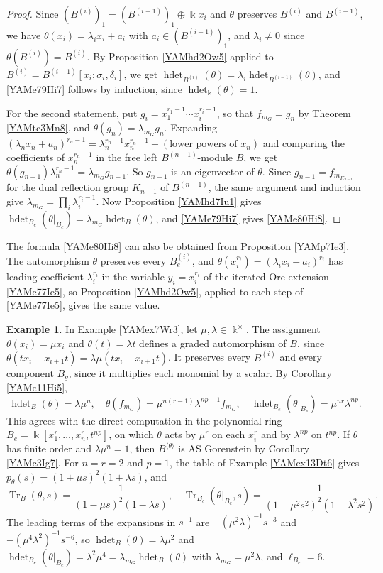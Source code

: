 \documentclass[reqno]{amsart}
\numberwithin{equation}{section}
\theoremstyle{definition}
\newtheorem{example}[equation]{Example}
\theoremstyle{remark}
\theoremstyle{plain}
\newcommand{\kk}{\Bbbk}
\DeclareMathOperator{\hdet}{hdet}
\DeclareMathOperator{\Tr}{Tr}
\begin{document}
\begin{proof}
Since $(B^{(i)})_1=(B^{(i-1)})_1\oplus\kk x_i$ and $\theta$ preserves $B^{(i)}$ and $B^{(i-1)}$, we have $\theta(x_i)=\lambda_ix_i+a_i$ with $a_i\in(B^{(i-1)})_1$, and $\lambda_i\neq0$ since $\theta(B^{(i)})=B^{(i)}$. By Proposition \ref{YAMhd2Ow5} applied to $B^{(i)}=B^{(i-1)}[x_i;\sigma_i,\delta_i]$, we get $\hdet_{B^{(i)}}(\theta)=\lambda_i\hdet_{B^{(i-1)}}(\theta)$, and \eqref{YAMe79Hi7} follows by induction, since $\hdet_\kk(\theta)=1$.

For the second statement, put $g_i=x_1^{r_1-1}\cdots x_i^{r_i-1}$, so that $f_{m_G}=g_n$ by Theorem \ref{YAMtc3Mn8}, and $\theta(g_n)=\lambda_{m_G}g_n$. Expanding $(\lambda_nx_n+a_n)^{r_n-1}=\lambda_n^{r_n-1}x_n^{r_n-1}+(\text{lower powers of }x_n)$ and comparing the coefficients of $x_n^{r_n-1}$ in the free left $B^{(n-1)}$-module $B$, we get $\theta(g_{n-1})\lambda_n^{r_n-1}=\lambda_{m_G}g_{n-1}$. So $g_{n-1}$ is an eigenvector of $\theta$. Since $g_{n-1}=f_{m_{K_{n-1}}}$ for the dual reflection group $K_{n-1}$ of $B^{(n-1)}$, the same argument and induction give $\lambda_{m_G}=\prod_i\lambda_i^{r_i-1}$. Now Proposition \ref{YAMhd7Iu1} gives $\hdet_{B_e}(\theta|_{B_e})=\lambda_{m_G}\hdet_B(\theta)$, and \eqref{YAMe79Hi7} gives \eqref{YAMe80Hi8}.
\end{proof}

The formula \eqref{YAMe80Hi8} can also be obtained from Proposition \ref{YAMp7Ie3}. The automorphism $\theta$ preserves every $B^{(i)}_e$, and $\theta(x_i^{r_i})=(\lambda_ix_i+a_i)^{r_i}$ has leading coefficient $\lambda_i^{r_i}$ in the variable $y_i=x_i^{r_i}$ of the iterated Ore extension \eqref{YAMe77Ie5}, so Proposition \ref{YAMhd2Ow5}, applied to each step of \eqref{YAMe77Ie5}, gives the same value.

\begin{example}\label{YAMex7Hw9}
In Example \ref{YAMex7Wr3}, let $\mu,\lambda\in\kk^\times$. The assignment $\theta(x_i)=\mu x_i$ and $\theta(t)=\lambda t$ defines a graded automorphism of $B$, since $\theta(tx_i-x_{i+1}t)=\lambda\mu(tx_i-x_{i+1}t)$. It preserves every $B^{(i)}$ and every component $B_g$, since it multiplies each monomial by a scalar. By Corollary \ref{YAMc11Hi5},
\[
\hdet_B(\theta)=\lambda\mu^n,\quad\theta(f_{m_G})=\mu^{n(r-1)}\lambda^{np-1}f_{m_G},\quad\hdet_{B_e}(\theta|_{B_e})=\mu^{nr}\lambda^{np}.
\]
This agrees with the direct computation in the polynomial ring $B_e=\kk[x_1^r,\dots,x_n^r,t^{np}]$, on which $\theta$ acts by $\mu^r$ on each $x_i^r$ and by $\lambda^{np}$ on $t^{np}$. If $\theta$ has finite order and $\lambda\mu^n=1$, then $B^{\langle\theta\rangle}$ is AS Gorenstein by Corollary \ref{YAMc3Ig7}. For $n=r=2$ and $p=1$, the table of Example \ref{YAMex13Dt6} gives $p_\theta(s)=(1+\mu s)^2(1+\lambda s)$, and
\[
\Tr_B(\theta,s)=\frac{1}{(1-\mu s)^2(1-\lambda s)},\quad\Tr_{B_e}(\theta|_{B_e},s)=\frac{1}{(1-\mu^2s^2)^2(1-\lambda^2s^2)}.
\]
The leading terms of the expansions in $s^{-1}$ are $-(\mu^2\lambda)^{-1}s^{-3}$ and $-(\mu^4\lambda^2)^{-1}s^{-6}$, so $\hdet_B(\theta)=\lambda\mu^2$ and $\hdet_{B_e}(\theta|_{B_e})=\lambda^2\mu^4=\lambda_{m_G}\hdet_B(\theta)$ with $\lambda_{m_G}=\mu^2\lambda$, and $\ell_{B_e}=6$.
\end{example}



\end{document}
